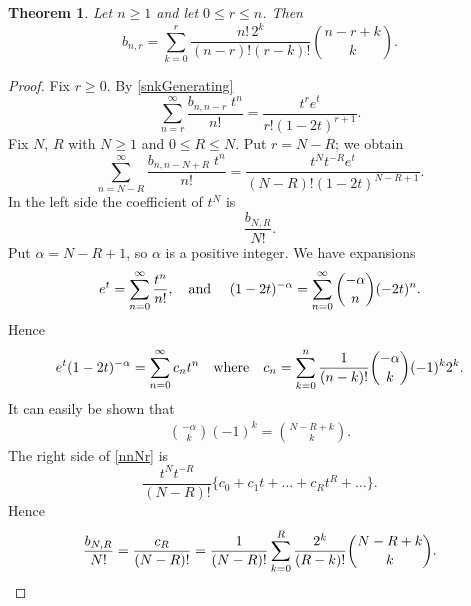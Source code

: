 \documentclass[11pt]{article}
\newtheorem{theorem}{Theorem}[section]
\newcommand{\q}{\quad}
\newcommand{\ges}{\geqslant}
\newcommand{\les}{\leqslant}
\begin{document}
\begin{theorem}{\label{formula:bnr}}
Let $n\ges 1$ and let $0\les r\les n$. Then
\[
b_{n,r}= \sum_{k=0}^r\frac{n!\,2^k}{(n-r)!(r-k)!}\binom{n-r+k}{k}.
\]
\end{theorem}
\begin{proof}
Fix $r\ges 0$. By \eqref{snkGenerating} 
\[
\sum_{n=r}^\infty  \frac{b_{n,n-r\,}\,t^n}{n!}=\frac{t^re^t}{r!(1-2t)^{r+1}}.
\]
Fix $N$, $R$ with $N\ges 1$ and $0\les R\les N$. Put $r=N-R$; we obtain
\[\label{nnNr}
\sum_{n=N-R}^\infty  \frac{b_{n,n-N+R\,}\,t^n}{n!}=\frac{t^Nt^{-R}e^t}{(N-R)!(1-2t)^{N-R+1}}.\tag{18}
\]
In the left side the coefficient of $t^N$ is
\[\dfrac{b_{N,R}}{N!}.\]
Put $\alpha=N-R+1$, so $\alpha$  is a positive integer. We have expansions
\[
e^t=\sum_{n=0}^\infty \frac{t^n}{n!},\text{\q and \q}
(1-2t)^{-\alpha}=\sum_{n=0}^\infty \binom{-\alpha} {n}(-2t)^n.
\]
Hence 
\[e^t(1-2t)^{-\alpha}=\sum_{n=0}^\infty c_n t^n \text{\q where\q}
c_n=\sum_{k=0}^n\frac1{(n-k)!}\binom{-\alpha} {k}(-1)^k2^k.
\]
It can easily be shown that
\begin{align*}
\binom{-\alpha} {k}(-1)^k
=\binom{N-R+k}{k}.
\end{align*}
The right side of \eqref{nnNr}  is 
\[
\frac{t^Nt^{-R}}{(N-R)!}\{c_0+c_1t+\dots+c_Rt^R+\dots\}.
\]
Hence
\[
\frac{b_{N,R}}{N!}=\frac{c_R}{(N-R)!}=\frac{1}{(N-R)!}
\sum_{k=0}^R\frac{2^k}{(R-k)!}\binom{N-R+k}{k}.\qedhere
\]
\end{proof}
\end{document}
